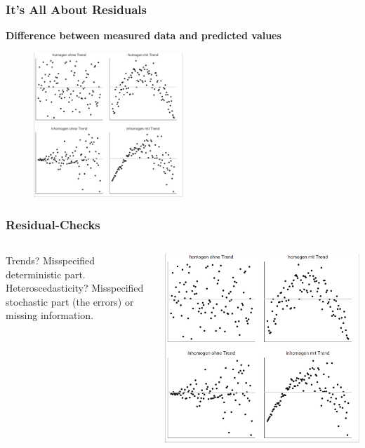 \documentclass{beamer}
\begin{document}
\begin{frame}
    \frametitle{It's All About Residuals}
    \textbf{Difference between measured data and predicted values}
    
    \begin{figure}[h]
        \centering
        \includegraphics[width=0.5\textwidth]{lectures/day_2_LM_refresh_I/figures/residuals.png} 
    \end{figure}
\end{frame}

\begin{frame}
    \frametitle{Residual-Checks}

    \begin{columns}
        \begin{column}{0.5\textwidth}
        Trends? Misspecified deterministic part. Heteroscedasticity? Misspecified stochastic part (the errors) or missing information.    
        \end{column}
        \begin{column}{0.5\textwidth}
            \includegraphics[width=\textwidth]{lectures/day_2_LM_refresh_I/figures/residuals.png}    
        \end{column}
    \end{columns}

\end{frame}
\end{document}
